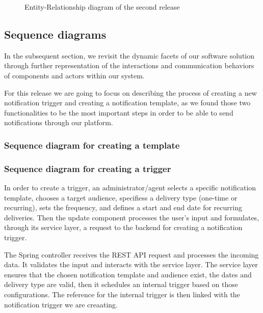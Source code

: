 \begin{landscape}
    \begin{figure}[hbt!]
        \centering
        
        \caption{Entity-Relationship diagram of the second release}
        \label{r2-erd}
    \end{figure}
\end{landscape}

\subsection{Sequence diagrams}
In the subsequent section, we revisit the dynamic facets of our software solution through further
representation of the interactions and communication behaviors of components and actors within our system.

For this release we are going to focus on describing the process of creating a new notification trigger and
creating a notification template, as we found those two functionalities to be the most important steps in
order to be able to send notifications through our platform.

\subsubsection{Sequence diagram for creating a template}


\subsubsection{Sequence diagram for creating a trigger}
In order to create a trigger, an administrator/agent selects a specific notification template, chooses a target
audience, specifiess a delivery type (one-time or recurring), sets the frequency, and defines a start and end
date for recurring deliveries. Then the update component processes the user's input and formulates, through
its service layer, a request to the backend for creating a notification trigger.

The Spring controller receives the REST API request and processes the incoming data. It validates the input
and interacts with the service layer. The service layer ensures that the chosen notification template and
audience exist, the dates and delivery type are valid, then it schedules an internal trigger based on those
configurations. The reference for the internal trigger is then linked with the notification trigger we are
creaating.

